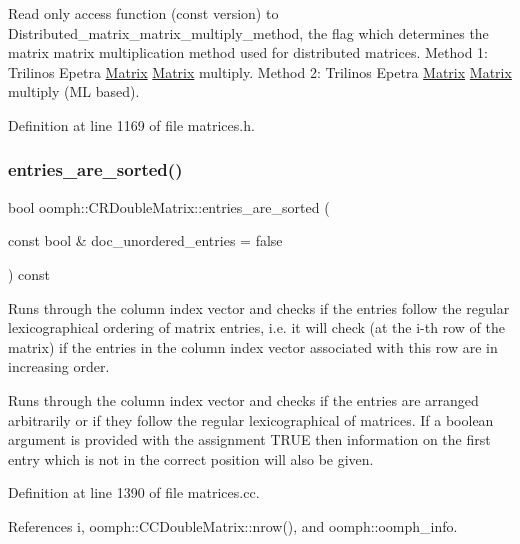 Read only access function (const version) to Distributed\+\_\+matrix\+\_\+matrix\+\_\+multiply\+\_\+method, the flag which determines the matrix matrix multiplication method used for distributed matrices. Method 1\+: Trilinos Epetra \hyperlink{classoomph_1_1Matrix}{Matrix} \hyperlink{classoomph_1_1Matrix}{Matrix} multiply. Method 2\+: Trilinos Epetra \hyperlink{classoomph_1_1Matrix}{Matrix} \hyperlink{classoomph_1_1Matrix}{Matrix} multiply (ML based). 



Definition at line 1169 of file matrices.\+h.

\mbox{\label{classoomph_1_1CRDoubleMatrix_ae35fbae1702bbf75601c2a1026df103e}} 
\subsubsection{\texorpdfstring{entries\+\_\+are\+\_\+sorted()}{entries\_are\_sorted()}}
{\footnotesize\ttfamily bool oomph\+::\+C\+R\+Double\+Matrix\+::entries\+\_\+are\+\_\+sorted (\begin{DoxyParamCaption}\item[{const bool \&}]{doc\+\_\+unordered\+\_\+entries = {\ttfamily false} }\end{DoxyParamCaption}) const}



Runs through the column index vector and checks if the entries follow the regular lexicographical ordering of matrix entries, i.\+e. it will check (at the i-\/th row of the matrix) if the entries in the column index vector associated with this row are in increasing order. 

Runs through the column index vector and checks if the entries are arranged arbitrarily or if they follow the regular lexicographical of matrices. If a boolean argument is provided with the assignment T\+R\+UE then information on the first entry which is not in the correct position will also be given. 

Definition at line 1390 of file matrices.\+cc.



References i, oomph\+::\+C\+C\+Double\+Matrix\+::nrow(), and oomph\+::oomph\+\_\+info.

